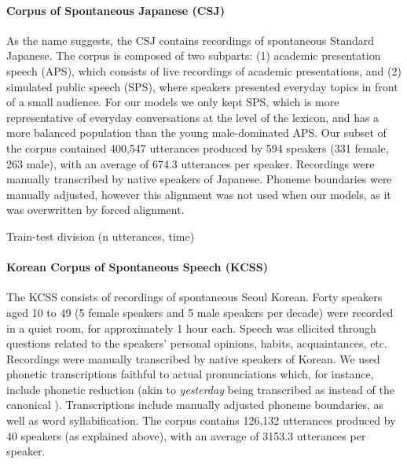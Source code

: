 \paragraph{Corpus of Spontaneous Japanese (CSJ)}
As the name suggests, the CSJ \cite{maekawa2003} contains recordings of spontaneous Standard Japanese. The corpus is composed of two subparts: (1) academic presentation speech (APS), which consists of live recordings of academic presentations, and (2) simulated public speech (SPS), where speakers presented everyday topics in front of a small audience. For our models we only kept SPS, which is more representative of everyday conversations at the level of the lexicon, and has a more balanced population than the young male-dominated APS.
Our subset of the corpus contained 400,547 utterances produced by 594 speakers (331 female, 263 male), with an average of 674.3 utterances per speaker.  
Recordings were manually transcribed by native speakers of Japanese. Phoneme boundaries were {\color{red}manually adjusted, however this alignment was not used when our models, as it was overwritten by forced alignment}.

\begin{itemize}
{\color{red}\item Train-test division (n utterances, time)}
\end{itemize}

\paragraph{Korean Corpus of Spontaneous Speech (KCSS)}

The KCSS \cite{yun2015} consists of recordings of spontaneous Seoul Korean. Forty speakers aged 10 to 49 (5 female speakers and 5 male speakers per decade) were recorded in a quiet room, for approximately 1 hour each. Speech was ellicited through questions related to the speakers' personal opinions, habits, acquaintances, etc.      
Recordings were manually transcribed by native speakers of Korean. We used phonetic transcriptions faithful to actual pronunciations which, for instance, include phonetic reduction (akin to \textit{yesterday} being transcribed as  instead of the canonical ). Transcriptions include {\color{red}manually adjusted} phoneme boundaries, as well as word syllabification.
The corpus contains 126,132 utterances produced by 40 speakers (as explained above), with an average of 3153.3 utterances per speaker. 

